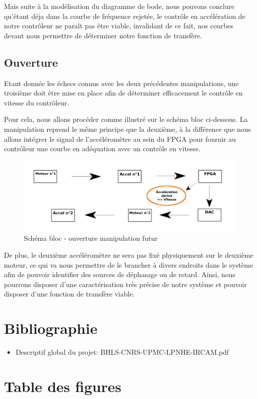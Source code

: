 \documentclass[french,a4paper,12pt]{report}
\begin{document}
			Mais suite à la modélisation du diagramme de bode, nous pouvons conclure qu'étant déja dans la courbe de fréquence rejetée, le contrôle en accélération de notre contrôleur ne paraît pas être viable, invalidant de ce fait, nos courbes devant nous permettre de déterminer notre fonction de transfère.
			
\newpage
			
		\chapter{Ouverture}
	
		Etant donnée les échecs connus avec les deux précédentes manipulations, une troisième doit être mise en place afin de déterminer efficacement le contrôle en vitesse du contrôleur.
		
		Pour cela, nous allons procéder comme illustré sur le schéma bloc ci-dessous. La manipulation reprend le même principe que la deuxième, à la différence que nous allons intégrer le signal de l'accéléromètre au sein du FPGA pour fournir au contrôleur une courbe en adéquation avec un contrôle en vitesse.
		
	\begin{figure}[!ht]
    \center
  	\includegraphics[width=18cm]{manip3.png}
    \caption{Schéma bloc - ouverture manipulation futur}
	\end{figure}
	
	De  plus, le deuxième accéléromètre ne sera pas fixé physiquement sur le deuxième moteur, ce qui va nous permettre de le brancher à divers endroits dans le système afin de pouvoir identifier des sources de déphasage ou de retard. Ainsi, nous pourrons disposer d'une caractérisation très précise de notre système et pouvoir disposer d'une fonction de transfère viable.
	
	
	
		
%
%

\part{Bibliographie}

	\begin{itemize}
		\item Descriptif global du projet: BHLS-CNRS-UPMC-LPNHE-IRCAM.pdf
	\end{itemize}


\part{Table des figures}

	\listoffigures
\end{document}
